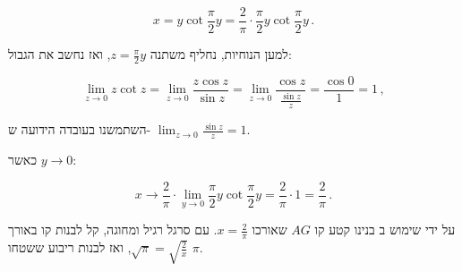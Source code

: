 \[
x = y\cot \frac{\pi}{2}y = \frac{2}{\pi}\cdot \frac{\pi}{2}y\cot \frac{\pi}{2}y\,.
\]

למען הנוחיות, נחליף משתנה
$z=\frac{\pi}{2}y$,
ואז נחשב את הגבול:

\[
\lim_{z\rightarrow 0} z\cot z = \lim_{z\rightarrow 0} \frac{z\cos z}{\sin z} = \lim_{z\rightarrow 0} \frac{\cos z}{\displaystyle\frac{\sin z}{z}} = \frac{\cos 0}{1} = 1\,,
\]

השתמשנו בעובדה הידועה ש-%
$\displaystyle\lim_{z\rightarrow 0} \frac{\sin z}{z}=1$.

כאשר
$y\rightarrow 0$:

\[
x \rightarrow \frac{2}{\pi}\cdot \lim_{y\rightarrow 0}\frac{\pi}{2}y\cot \frac{\pi}{2}y = \frac{2}{\pi}\cdot 1 = \frac{2}{\pi}\,.
\]

על ידי שימוש ב%
\qd{}
בנינו קטע קו
$AG$
שאורכו
$x=\displaystyle\frac{2}{\pi}$.
עם סרגל רגיל ומחוגה, קל לבנות קו באורך
$\sqrt{\pi}=\sqrt{\displaystyle\frac{2}{x}}$,
ואז לבנות ריבוע ששטחו
$\pi$.

